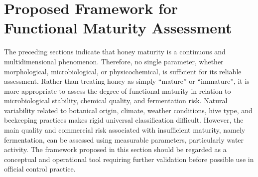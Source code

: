 
\section{Proposed Framework for Functional Maturity Assessment}

The preceding sections indicate that honey maturity is a continuous and multidimensional phenomenon. Therefore, no single parameter, whether morphological, microbiological, or physicochemical, is sufficient for its reliable assessment. Rather than treating honey as simply “mature” or “immature”, it is more appropriate to assess the degree of functional maturity in relation to microbiological stability, chemical quality, and fermentation risk. Natural variability related to botanical origin, climate, weather conditions, hive type, and beekeeping practices makes rigid universal classification difficult. However, the main quality and commercial risk associated with insufficient maturity, namely fermentation, can be assessed using measurable parameters, particularly water activity. The framework proposed in this section should be regarded as a conceptual and operational tool requiring further validation before possible use in official control practice.



